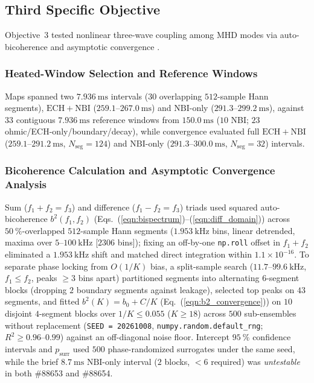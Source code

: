 \subsection{Third Specific Objective}
Objective~3 tested nonlinear three-wave coupling among MHD modes via auto-bicoherence and asymptotic convergence \cite{Kin2025, Miyashita2025}.

\subsubsection{Heated-Window Selection and Reference Windows}
Maps spanned two $7.936~\mathrm{ms}$ intervals ($30$ overlapping $512$-sample Hann segments), $\mathrm{ECH}+\mathrm{NBI}$ ($259.1\text{--}267.0~\mathrm{ms}$) and $\mathrm{NBI}$-only ($291.3\text{--}299.2~\mathrm{ms}$), against $33$ contiguous $7.936~\mathrm{ms}$ reference windows from $150.0~\mathrm{ms}$ ($10$ NBI; $23$ ohmic/ECH-only/boundary/decay), while convergence evaluated full $\mathrm{ECH}+\mathrm{NBI}$ ($259.1\text{--}291.2~\mathrm{ms}$, $N_{\mathrm{seg}} = 124$) and $\mathrm{NBI}$-only ($291.3\text{--}300.0~\mathrm{ms}$, $N_{\mathrm{seg}} = 32$) intervals.

\subsubsection{Bicoherence Calculation and Asymptotic Convergence Analysis}
Sum ($f_1 + f_2 = f_3$) and difference ($f_1 - f_2 = f_3$) triads used squared auto-bicoherence $b^2(f_1, f_2)$ (Eqs.~(\ref{eqn:bispectrum})--(\ref{eqn:diff_domain})) \cite{Hou2019, Fujisawa2021} across $50~\%$-overlapped $512$-sample Hann segments ($1.953~\mathrm{kHz}$ bins, linear detrended, maxima over $5\text{--}100~\mathrm{kHz}$ [$2306$ bins]); fixing an off-by-one \texttt{np.roll} offset in $f_1 + f_2$ eliminated a $1.953~\mathrm{kHz}$ shift and matched direct integration within $1.1 \times 10^{-16}$. To separate phase locking from $O(1/K)$ bias, a split-sample search ($11.7\text{--}99.6~\mathrm{kHz}$, $f_1 \le f_2$, peaks $\ge 3$ bins apart) partitioned segments into alternating $6$-segment blocks (dropping $2$ boundary segments against leakage), selected top peaks on $43$ segments, and fitted $b^2(K) = b_0 + C/K$ (Eq.~(\ref{eqn:b2_convergence})) on $10$ disjoint $4$-segment blocks over $1/K \le 0.055$ ($K \ge 18$) across $500$ sub-ensembles without replacement (\texttt{SEED = 20261008}, \texttt{numpy.random.default\_rng}; $R^2 \ge 0.96\text{--}0.99$) against an off-diagonal noise floor. Intercept $95~\%$ confidence intervals and $p_{\mathrm{surr}}$ used $500$ phase-randomized surrogates under the same seed, while the brief $8.7~\mathrm{ms}$ $\mathrm{NBI}$-only interval ($2$ blocks, $<6$ required) was \emph{untestable} in both \#88653 and \#88654.

